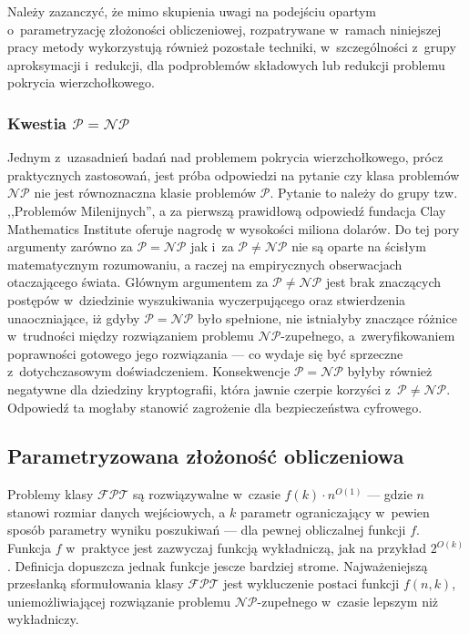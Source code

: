 {Należy zazanczyć, że mimo skupienia uwagi na podejściu opartym o~parametryzację złożoności obliczeniowej, rozpatrywane w~ramach niniejszej pracy metody wykorzystują również pozostałe techniki, w~szczególności z~grupy aproksymacji i~redukcji, dla podproblemów składowych lub redukcji problemu pokrycia wierzchołkowego.
}
\subsubsection{\textbf{Kwestia $\mathcal{P}=\mathcal{NP}$}}
\label{sss_problem_p_neq_np}
\par{
  Jednym z~uzasadnień badań nad problemem pokrycia wierzchołkowego, prócz
  praktycznych zastosowań, jest próba odpowiedzi na pytanie czy klasa problemów
  $\mathcal{NP}$ nie jest równoznaczna klasie problemów $\mathcal{P}$.
  Pytanie to należy do grupy tzw. ,,Problemów Milenijnych'', a za pierwszą
  prawidłową odpowiedź fundacja Clay Mathematics Institute oferuje nagrodę w
  wysokości miliona dolarów. 
  Do tej pory argumenty zarówno za $\mathcal{P}=\mathcal{NP}$ jak i~za
  $\mathcal{P}\neq\mathcal{NP}$ nie są oparte na ścisłym matematycznym
  rozumowaniu, a raczej na empirycznych obserwacjach otaczającego świata.
  Głównym argumentem za $\mathcal{P}\neq\mathcal{NP}$ jest brak znaczących
  postępów w~dziedzinie wyszukiwania wyczerpującego oraz stwierdzenia
  unaoczniające, iż gdyby $\mathcal{P}=\mathcal{NP}$ było spełnione, nie 
  istniałyby znaczące różnice w~trudności między rozwiązaniem 
  problemu $\mathcal{NP}$-zupełnego, a~zweryfikowaniem poprawności gotowego 
  jego rozwiązania --- co wydaje się być sprzeczne z~dotychczasowym doświadczeniem.
  Konsekwencje $\mathcal{P}=\mathcal{NP}$ byłyby również negatywne dla dziedziny
  kryptografii, która jawnie czerpie korzyści z~$\mathcal{P}\neq\mathcal{NP}$.
  Odpowiedź ta mogłaby stanowić zagrożenie dla bezpieczeństwa cyfrowego.
}

\subsection{Parametryzowana złożoność obliczeniowa}
\label{sss_parametric_complexity}
\par{
  Problemy klasy $\mathcal{FPT}$ są rozwiązywalne w~czasie $f(k)\cdot n^{O(1)}$ --- gdzie $n$ stanowi rozmiar danych wejściowych, a $k$ parametr ograniczający w~pewien sposób parametry wyniku poszukiwań --- dla pewnej obliczalnej funkcji $f$.
  Funkcja $f$ w~praktyce jest zazwyczaj funkcją wykładniczą, jak na przykład $2^{O(k)}$.
  Definicja dopuszcza jednak funkcje jescze bardziej strome.
  Najważeniejszą przesłanką sformułowania klasy $\mathcal{FPT}$ jest wykluczenie postaci funkcji $f(n,k)$, uniemożliwiającej rozwiązanie problemu $\mathcal{NP}$-zupełnego w~czasie lepszym niż wykładniczy.
}

